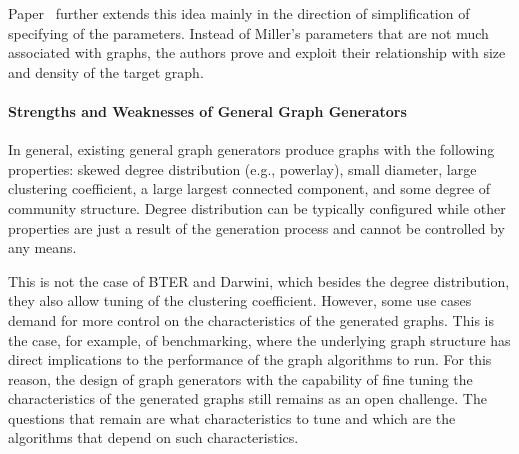 Paper~\cite{DBLP:conf/wbdb/AmmarO13} further extends this idea mainly in the direction of simplification of specifying of the parameters. Instead of Miller's parameters that are not much associated with graphs, the authors prove and exploit their relationship with size and density of the target graph.

\paragraph{Strengths and Weaknesses of General Graph Generators}
In general, existing general graph generators produce graphs with the following
properties: skewed degree distribution (e.g., powerlay), small diameter, large
clustering coefficient, a large largest connected component, and some degree of
community structure. Degree distribution can be typically configured while other
properties are just a result of the generation process and cannot be controlled
by any means.

This is not the case of BTER and Darwini, which besides the degree distribution,
they also allow tuning of the clustering coefficient. However, some use cases
demand for more control on the characteristics of the generated graphs.
This is the case, for example, of benchmarking, where the underlying graph
structure has direct implications to the performance of the graph algorithms
to run. For this reason, the design of graph generators with the capability of fine
tuning the characteristics of the generated graphs still remains as an open
challenge. The questions that remain are what characteristics to tune
and which are the algorithms that depend on such characteristics.
